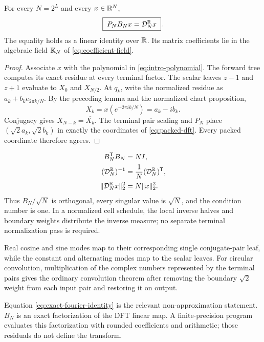 \begin{theorem}
For every $N=2^L$ and every $x\in\mathbb{R}^N$,
\begin{equation}
 \boxed{\;P_NB_Nx=\mathcal{D}_N^{\mathbb{R}}x\;}.
 \label{eq:exact-fourier-identity}
\end{equation}
The equality holds as a linear identity over $\mathbb{R}$.  Its matrix coefficients lie
in the algebraic field $\mathbb{K}_N$ of \eqref{eq:coefficient-field}.
\end{theorem}
\begin{proof}
Associate $x$ with the polynomial in \eqref{eq:intro-polynomial}.  The forward
tree computes its exact residue at every terminal factor.  The scalar leaves
$z-1$ and $z+1$ evaluate to $X_0$ and $X_{N/2}$.  At $q_k$, write the normalized
residue as $a_k+b_ke_{2\pi k/N}$.  By the preceding lemma and the normalized
chart proposition,
\[
 X_k=x(e^{-2\pi ik/N})=a_k-ib_k.
\]
Conjugacy gives $X_{N-k}=\overline{X_k}$.  The terminal pair scaling and $P_N$
place $(\sqrt2a_k,\sqrt2b_k)$ in exactly the coordinates of
\eqref{eq:packed-dft}.  Every packed coordinate therefore agrees.
\end{proof}

\begin{corollary}
\begin{equation}
\begin{aligned}
 B_N^{\mathsf{T}}B_N&=NI,\\
 (\mathcal{D}_N^{\mathbb{R}})^{-1}&={1\over N}(\mathcal{D}_N^{\mathbb{R}})^{\mathsf{T}},\\
 \|\mathcal{D}_N^{\mathbb{R}}x\|_2^2&=N\|x\|_2^2.
\end{aligned}
 \label{eq:inverse-parseval}
\end{equation}
Thus $B_N/\sqrt N$ is orthogonal, every singular value is $\sqrt N$, and the
condition number is one.  In a normalized cell schedule, the local inverse
halves and boundary weights distribute the inverse measure; no separate
terminal normalization pass is required.
\end{corollary}

\begin{corollary}
Real cosine and sine modes map to their corresponding single conjugate-pair
leaf, while the constant and alternating modes map to the scalar leaves.  For
circular convolution, multiplication of the complex numbers represented by
the terminal pairs gives the ordinary convolution theorem after removing the
boundary $\sqrt2$ weight from each input pair and restoring it on output.
\end{corollary}

Equation \eqref{eq:exact-fourier-identity} is the relevant non-approximation
statement.  $B_N$ is an exact factorization of the DFT linear map.  A
finite-precision program evaluates this factorization with rounded coefficients
and arithmetic; those residuals do not define the transform.
